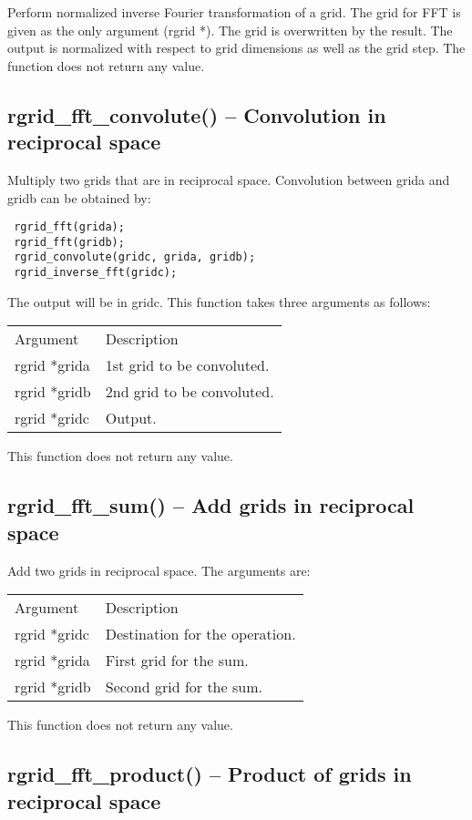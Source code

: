 \documentclass[12pt,letterpaper]{report}
\begin{document}
Perform normalized inverse Fourier transformation of a grid. The grid for FFT is given as the only argument (rgrid *). The grid is overwritten by the result. The output is normalized with respect to grid dimensions as well as the grid step. The function does not return any value.

\subsection{rgrid\_fft\_convolute() -- Convolution in reciprocal space}

Multiply two grids that are in reciprocal space. Convolution between grida and gridb can be obtained by:
\begin{verbatim}
 rgrid_fft(grida);
 rgrid_fft(gridb);
 rgrid_convolute(gridc, grida, gridb);
 rgrid_inverse_fft(gridc);
\end{verbatim}
The output will be in gridc. This function takes three arguments as follows:
\begin{longtable}{p{} p{}}
Argument & Description\\
\cline{1-2}
rgrid *grida & 1st grid to be convoluted.\\ 
rgrid *gridb & 2nd grid to be convoluted.\\
rgrid *gridc & Output.\\
\end{longtable}
\noindent
This function does not return any value.

\subsection{rgrid\_fft\_sum() -- Add grids in reciprocal space}

Add two grids in reciprocal space. The arguments are:
\begin{longtable}{p{} p{}}
Argument & Description\\
\cline{1-2}
rgrid *gridc & Destination for the operation.\\
rgrid *grida & First grid for the sum.\\
rgrid *gridb & Second grid for the sum.\\
\end{longtable}
\noindent
This function does not return any value.

\subsection{rgrid\_fft\_product() -- Product of grids in reciprocal space}
\end{document}
